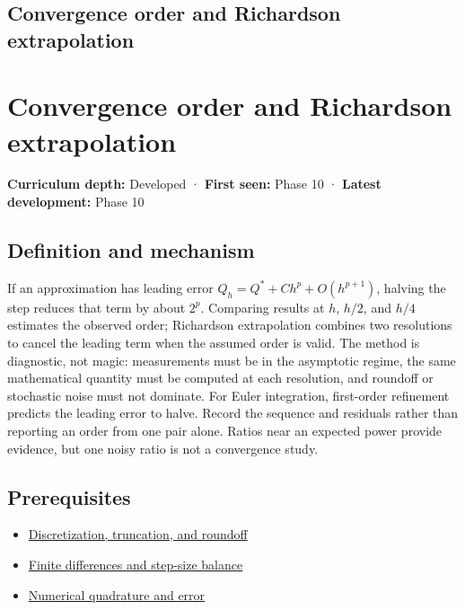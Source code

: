 \hypertarget{appendix-aca80b6bf17a}{}
\section*{Convergence order and Richardson extrapolation}
\chapter{Convergence order and Richardson extrapolation}\label{appendix-aca80b6bf17a-convergence-order-and-richardson-extrapolation}

\textbf{Curriculum depth:} Developed · \textbf{First seen:} Phase 10 · \textbf{Latest development:} Phase 10

\section{Definition and mechanism}\label{appendix-aca80b6bf17a-definition-and-mechanism}

If an approximation has leading error \(Q_h=Q^*+Ch^p+O(h^{p+1})\), halving the step reduces that term by about \(2^p\). Comparing results at \(h\), \(h/2\), and \(h/4\) estimates the observed order; Richardson extrapolation combines two resolutions to cancel the leading term when the assumed order is valid. The method is diagnostic, not magic: measurements must be in the asymptotic regime, the same mathematical quantity must be computed at each resolution, and roundoff or stochastic noise must not dominate. For Euler integration, first-order refinement predicts the leading error to halve. Record the sequence and residuals rather than reporting an order from one pair alone. Ratios near an expected power provide evidence, but one noisy ratio is not a convergence study.

\section{Prerequisites}\label{appendix-aca80b6bf17a-prerequisites}

\begin{itemize}
\tightlist
\item
  \hyperref[appendix-6b0648b2b8e8]{Discretization, truncation, and roundoff}
\item
  \hyperref[appendix-e2d7b4f2161d]{Finite differences and step-size balance}
\item
  \hyperref[appendix-80521eae6b71]{Numerical quadrature and error}
\end{itemize}


